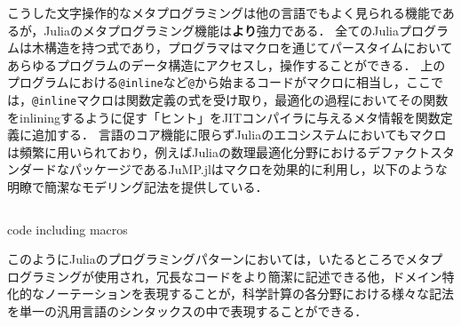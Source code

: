 こうした文字操作的なメタプログラミングは他の言語でもよく見られる機能であるが，Juliaのメタプログラミング機能は\textbf{より}強力である．
全てのJuliaプログラムは木構造を持つ式であり，プログラマはマクロを通じてパースタイムにおいてあらゆるプログラムのデータ構造にアクセスし，操作することができる．
上のプログラムにおける\texttt{@inline}など\texttt{@}から始まるコードがマクロに相当し，ここでは，\texttt{@inline}マクロは関数定義の式を受け取り，最適化の過程においてその関数をinliningするように促す「ヒント」をJITコンパイラに与えるメタ情報を関数定義に追加する．
言語のコア機能に限らずJuliaのエコシステムにおいてもマクロは頻繁に用いられており，例えばJuliaの数理最適化分野におけるデファクトスタンダードなパッケージであるJuMP.jl\cite{DunningHuchetteLubin2017}はマクロを効果的に利用し，以下のような明瞭で簡潔なモデリング記法を提供している．

\begin{listing}[ht]
  \inputminted[frame=lines, firstline=4, lastline=10]{julia}{jump.jl}
  \caption{code including macros}
  \label{lst:target2}
\end{listing}

このようにJuliaのプログラミングパターンにおいては，いたるところでメタプログラミングが使用され\footnotemark，冗長なコードをより簡潔に記述できる他，ドメイン特化的なノーテーションを表現することが，科学計算の各分野における様々な記法を単一の汎用言語のシンタックスの中で表現することができる\cite{jeff-phd}．


